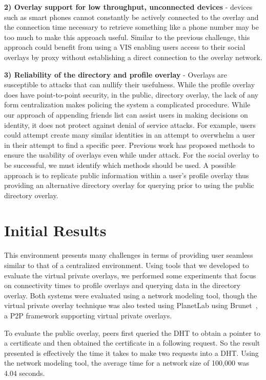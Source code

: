 \documentclass{sig-alternate}
\begin{document}
{\bf 2) Overlay support for low throughput, unconnected devices} - devices such
as smart phones cannot constantly be actively connected to the overlay and the
connection time necessary to retrieve something like a phone number may be too
much to make this approach useful.  Similar to the previous challenge, this
approach could benefit from using a VIS enabling users access to their social
overlays by proxy without establishing a direct connection to the overlay
network.

{\bf 3) Reliability of the directory and profile overlay} - Overlays are
susceptible to attacks that can nullify their usefulness.  While the profile
overlay does have point-to-point security, in the public, directory overlay,
the lack of any form centralization makes policing the system a complicated
procedure.  While our approach of appending friends list can assist users in
making decisions on identity, it does not protect against denial of service
attacks.  For example, users could attempt create many similar identities in
an attempt to overwhelm a user in their attempt to find a specific peer.
Previous work has proposed methods to ensure the usability of overlays even
while under attack.  For the social overlay to be successful, we must identify
which methods should be used. A possible approach is to replicate public
information within a user's profile overlay thus providing an alternative
directory overlay for querying prior to using the public directory overlay.

\section{Initial Results}
\label{experiments}

This environment presents many challenges in terms of providing user seamless
similar to that of a centralized environment.  Using tools that we developed
to evaluate the virtual private overlays, we performed some experiments that
focus on connectivity times to profile overlays and querying data in the
directory overlay.  Both systems were evaluated using a network modeling tool,
though the virtual private overlay technique was also tested using PlanetLab
using Brunet~\cite{brunet}, a P2P framework supporting virtual private overlays.

To evaluate the public overlay, peers first queried the DHT to obtain a pointer
to a certificate and then obtained the certificate in a following request.  So
the result presented is effectively the time it takes to make two requests into
a DHT.  Using the network modeling tool, the average time for a network size of
100,000 was 4.04 seconds.
\end{document}
